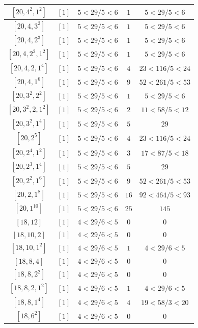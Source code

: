 \documentclass{article}%
\begin{document}
\begin{center}
\begin{longtable}{||c|c|c|c|c||}
$[20, 4^{2}, 1^{2}]$ & $[1]$ & $5 < 29/5 < 6$ & $1$ & $5 < 29/5 < 6$ \\ \hline 
$[20, 4, 3^{2}]$ & $[1]$ & $5 < 29/5 < 6$ & $1$ & $5 < 29/5 < 6$ \\ \hline 
$[20, 4, 2^{3}]$ & $[1]$ & $5 < 29/5 < 6$ & $1$ & $5 < 29/5 < 6$ \\ \hline 
$[20, 4, 2^{2}, 1^{2}]$ & $[1]$ & $5 < 29/5 < 6$ & $1$ & $5 < 29/5 < 6$ \\ \hline 
$[20, 4, 2, 1^{4}]$ & $[1]$ & $5 < 29/5 < 6$ & $4$ & $23 < 116/5 < 24$ \\ \hline 
$[20, 4, 1^{6}]$ & $[1]$ & $5 < 29/5 < 6$ & $9$ & $52 < 261/5 < 53$ \\ \hline 
$[20, 3^{2}, 2^{2}]$ & $[1]$ & $5 < 29/5 < 6$ & $1$ & $5 < 29/5 < 6$ \\ \hline 
$[20, 3^{2}, 2, 1^{2}]$ & $[1]$ & $5 < 29/5 < 6$ & $2$ & $11 < 58/5 < 12$ \\ \hline 
$[20, 3^{2}, 1^{4}]$ & $[1]$ & $5 < 29/5 < 6$ & $5$ & $29$ \\ \hline 
$[20, 2^{5}]$ & $[1]$ & $5 < 29/5 < 6$ & $4$ & $23 < 116/5 < 24$ \\ \hline 
$[20, 2^{4}, 1^{2}]$ & $[1]$ & $5 < 29/5 < 6$ & $3$ & $17 < 87/5 < 18$ \\ \hline 
$[20, 2^{3}, 1^{4}]$ & $[1]$ & $5 < 29/5 < 6$ & $5$ & $29$ \\ \hline 
$[20, 2^{2}, 1^{6}]$ & $[1]$ & $5 < 29/5 < 6$ & $9$ & $52 < 261/5 < 53$ \\ \hline 
$[20, 2, 1^{8}]$ & $[1]$ & $5 < 29/5 < 6$ & $16$ & $92 < 464/5 < 93$ \\ \hline 
$[20, 1^{10}]$ & $[1]$ & $5 < 29/5 < 6$ & $25$ & $145$ \\ \hline 
$[18, 12]$ & $[1]$ & $4 < 29/6 < 5$ & $0$ & $0$ \\ \hline 
$[18, 10, 2]$ & $[1]$ & $4 < 29/6 < 5$ & $0$ & $0$ \\ \hline 
$[18, 10, 1^{2}]$ & $[1]$ & $4 < 29/6 < 5$ & $1$ & $4 < 29/6 < 5$ \\ \hline 
$[18, 8, 4]$ & $[1]$ & $4 < 29/6 < 5$ & $0$ & $0$ \\ \hline 
$[18, 8, 2^{2}]$ & $[1]$ & $4 < 29/6 < 5$ & $0$ & $0$ \\ \hline 
$[18, 8, 2, 1^{2}]$ & $[1]$ & $4 < 29/6 < 5$ & $1$ & $4 < 29/6 < 5$ \\ \hline 
$[18, 8, 1^{4}]$ & $[1]$ & $4 < 29/6 < 5$ & $4$ & $19 < 58/3 < 20$ \\ \hline 
$[18, 6^{2}]$ & $[1]$ & $4 < 29/6 < 5$ & $0$ & $0$ \\ \hline 

\end{longtable}
\end{center}
\end{document}

